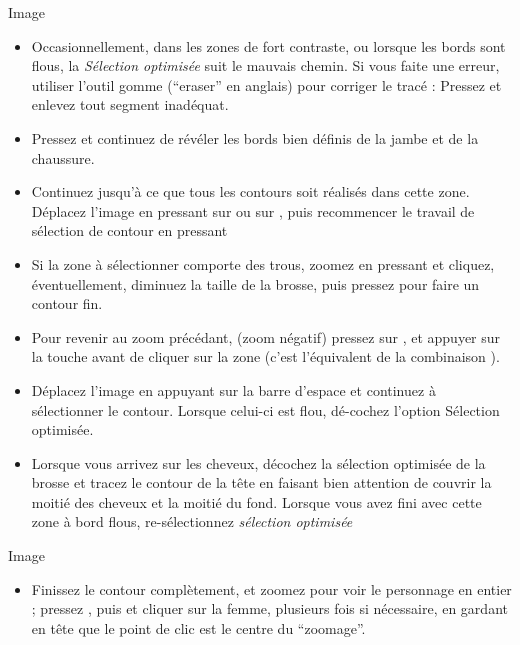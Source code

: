 \documentclass[a4paper,12pt,french]{sphinxmanual}
\begin{document}
Image
\begin{itemize}
\item {} 
Occasionnellement, dans les zones de fort contraste, ou lorsque les bords sont flous, la \emph{Sélection optimisée} suit le mauvais chemin. Si vous faite une erreur, utiliser l'outil gomme (``eraser'' en anglais) pour corriger le tracé : Pressez  et enlevez tout segment inadéquat.

\item {} 
Pressez  et continuez de révéler les bords bien définis de la jambe et de la chaussure.

\item {} 
Continuez jusqu'à ce que tous les contours soit réalisés dans cette zone. Déplacez l'image en pressant sur  ou sur , puis recommencer le travail de sélection de contour en pressant 

\item {} 
Si la zone à sélectionner comporte des trous, zoomez en pressant  et cliquez, éventuellement, diminuez la taille de la brosse, puis pressez  pour faire un contour fin.

\item {} 
Pour revenir au zoom précédant, (zoom négatif) pressez sur , et appuyer sur la touche  avant de cliquer sur la zone (c'est l'équivalent de la combinaison ).

\item {} 
Déplacez l'image en appuyant sur la barre d'espace et continuez à sélectionner le contour. Lorsque celui-ci est flou, dé-cochez l'option Sélection optimisée.

\item {} 
Lorsque vous arrivez sur les cheveux, décochez la sélection optimisée de la brosse et tracez le contour de la tête en faisant bien attention de couvrir la moitié des cheveux et la moitié du fond. Lorsque vous avez fini avec cette zone à bord flous, re-sélectionnez \emph{sélection optimisée}

\end{itemize}

Image
\begin{itemize}
\item {} 
Finissez le contour complètement, et zoomez pour voir le personnage en entier ; pressez , puis  et cliquer sur la femme, plusieurs fois si nécessaire, en gardant en tête que le point de clic est le centre du ``zoomage''.

\end{itemize}
\end{document}
